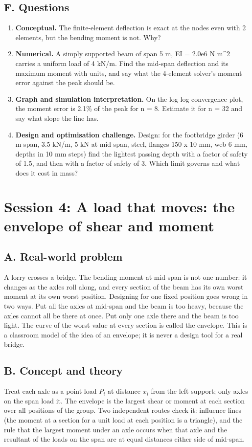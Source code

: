 \documentclass[11pt,a4paper]{article}
\begin{document}
\subsection*{F. Questions}
\begin{enumerate}[nosep]
\item \textbf{Conceptual.} The finite-element deflection is exact at the nodes even with 2 elements, but the bending moment is not. Why?
\item \textbf{Numerical.} A simply supported beam of span 5 m, EI = 2.0e6 N m\textasciicircum{}2 carries a uniform load of 4 kN/m. Find the mid-span deflection and its maximum moment with units, and say what the 4-element solver's moment error against the peak should be.
\item \textbf{Graph and simulation interpretation.} On the log-log convergence plot, the moment error is 2.1\% of the peak for n = 8. Estimate it for n = 32 and say what slope the line has.
\item \textbf{Design and optimisation challenge.} Design: for the footbridge girder (6 m span, 3.5 kN/m, 5 kN at mid-span, steel, flanges 150 x 10 mm, web 6 mm, depths in 10 mm steps) find the lightest passing depth with a factor of safety of 1.5, and then with a factor of safety of 3. Which limit governs and what does it cost in mass?
\end{enumerate}

\section{Session 4: A load that moves: the envelope of shear and moment}

\subsection*{A. Real-world problem}
A lorry crosses a bridge. The bending moment at mid-span is not one number: it changes as the axles roll along, and every section of the beam has its own worst moment at its own worst position. Designing for one fixed position goes wrong in two ways. Put all the axles at mid-span and the beam is too heavy, because the axles cannot all be there at once. Put only one axle there and the beam is too light. The curve of the worst value at every section is called the envelope. This is a classroom model of the idea of an envelope; it is never a design tool for a real bridge.

\subsection*{B. Concept and theory}
Treat each axle as a point load $P_i$ at distance $x_i$ from the left support; only axles on the span load it. The envelope is the largest shear or moment at each section over all positions of the group. Two independent routes check it: influence lines (the moment at a section for a unit load at each position is a triangle), and the rule that the largest moment under an axle occurs when that axle and the resultant of the loads on the span are at equal distances either side of mid-span.
\end{document}
